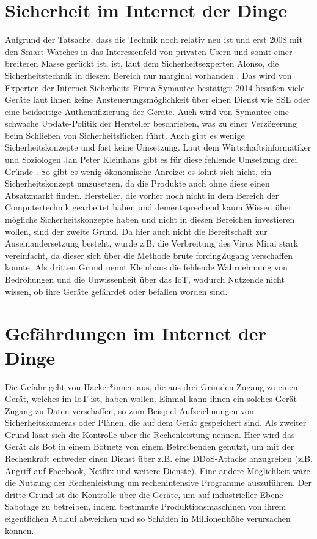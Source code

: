 \section{Sicherheit im Internet der Dinge}
Aufgrund der Tatsache, dass die Technik noch relativ neu ist und erst 2008 mit den Smart-Watches in das Interessenfeld von privaten Usern und somit einer breiteren Masse gerückt ist, ist, laut dem Sicherheitsexperten Alonso, die Sicherheitstechnik in diesem Bereich nur marginal vorhanden \cite{chemaalonso16}. Das wird von Experten der Internet-Sicherheits-Firma Symantec bestätigt: 2014 besaßen viele Geräte laut ihnen keine Ansteuerungsmöglichkeit über einen Dienst wie SSL oder eine beidseitige Authentifizierung der Geräte\cite{insecurity15}. Auch wird von Symantec eine schwache Update-Politik der Hersteller beschrieben, was zu einer Verzögerung beim Schließen von Sicherheitslücken führt. Auch gibt es wenige Sicherheitskonzepte und fast keine Umsetzung.
Laut dem Wirtschaftsinformatiker und Soziologen Jan Peter Kleinhans gibt es für diese fehlende Umsetzung drei Gründe \cite{kleinhans16}. So gibt es wenig ökonomische Anreize: es lohnt sich nicht, ein Sicherheitskonzept umzusetzen, da die Produkte auch ohne diese einen Absatzmarkt finden.
Hersteller, die vorher noch nicht in dem Bereich der Computertechnik gearbeitet haben und dementsprechend kaum Wissen über mögliche Sicherheitskonzepte haben und nicht in diesen Bereichen investieren wollen, sind der zweite Grund. Da hier auch nicht die Bereitschaft zur Auseinandersetzung besteht, wurde z.B. die Verbreitung des Virus Mirai stark vereinfacht, da dieser sich über die Methode \grqq brute forcing\grqq   Zugang verschaffen konnte.
Als dritten Grund nennt Kleinhans die fehlende Wahrnehmung von Bedrohungen und die Unwissenheit über das IoT, wodurch Nutzende nicht wissen, ob ihre Geräte gefährdet oder befallen worden sind.

\section{Gefährdungen im Internet der Dinge}
Die Gefahr geht von Hacker*innen aus, die aus drei Gründen Zugang zu einem Gerät, welches im IoT ist, haben wollen.
Einmal kann ihnen ein solches Gerät Zugang zu Daten verschaffen, so zum Beispiel Aufzeichnungen von Sicherheitskameras oder Plänen, die auf dem Gerät gespeichert sind. Als zweiter Grund lässt sich die Kontrolle über die Rechenleistung nennen. Hier wird das Gerät als Bot in einem Botnetz von einem Betreibenden genutzt, um mit der Rechenkraft entweder einen Dienst über z.B. eine DDoS-Attacke anzugreifen (z.B. Angriff auf Facebook, Netflix und weitere Dienste). Eine andere Möglichkeit wäre die Nutzung der Rechenleistung um rechenintensive Programme auszuführen.
Der dritte Grund ist die Kontrolle über die Geräte, um auf industrieller Ebene Sabotage zu betreiben, indem bestimmte Produktionsmaschinen von ihrem eigentlichen Ablauf abweichen und so Schäden in Millionenhöhe verursachen können.

